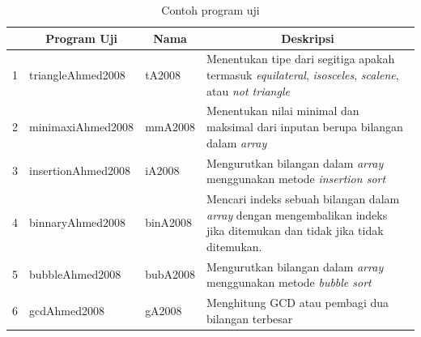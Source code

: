  \begin{table}[h!]
 	\begin{center}
 		\caption{Contoh program uji}
 		\label{tab:jadwal}
 		\footnotesize
 			\begin{tabular}{|l|l|l|p{9cm}|}
 				\hline
 				\rowcolor[HTML]{EFEFEF} 
 				\multicolumn{1}{|c|}{\cellcolor[HTML]{EFEFEF}\textbf{No}} & \multicolumn{1}{c|}{\cellcolor[HTML]{EFEFEF}\textbf{Program Uji}} & \multicolumn{1}{c|}{\cellcolor[HTML]{EFEFEF}\textbf{Nama}} & \multicolumn{1}{c|}{\cellcolor[HTML]{EFEFEF}\textbf{Deskripsi}}                                                       \\ \hline
 				1                                                         & triangleAhmed2008                                                 & tA2008                                                     & Menentukan tipe dari segitiga apakah termasuk \textit{equilateral}, \textit{isosceles}, \textit{scalene}, atau \textit{not triangle}                      \\ \hline
 				2                                                         & minimaxiAhmed2008                                                 & mmA2008                                                    & Menentukan nilai minimal dan maksimal dari inputan berupa bilangan dalam \textit{array}                                        \\ \hline
 				3                                                         & insertionAhmed2008                                                & iA2008                                                     & Mengurutkan bilangan dalam \textit{array} menggunakan metode \textit{insertion sort}                                                    \\ \hline
 				4                                                         & binnaryAhmed2008                                                  & binA2008                                                   & Mencari indeks sebuah bilangan dalam \textit{array} dengan mengembalikan indeks jika ditemukan dan tidak jika tidak ditemukan. \\ \hline
 				5                                                         & bubbleAhmed2008                                                   & bubA2008                                                   & Mengurutkan bilangan dalam \textit{array} menggunakan metode \textit{bubble sort  }                                                     \\ \hline
 				6                                                         & gcdAhmed2008                                                      & gA2008                                                     & Menghitung GCD atau pembagi dua bilangan terbesar                                                                     \\ \hline

\end{tabular}
\end{center}
\end{table}
